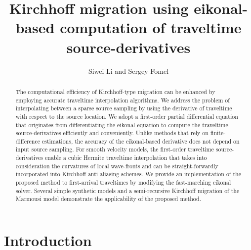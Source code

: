 \title{Kirchhoff migration using eikonal-based computation of traveltime source-derivatives}

\author{Siwei Li and Sergey Fomel}


\address{Bureau of Economic Geology \\
John A. and Katherine G. Jackson School of Geosciences \\
The University of Texas at Austin \\
University Station, Box X \\
Austin, TX 78713-8924}


\maketitle

\begin{abstract}
The computational efficiency of Kirchhoff-type migration can be enhanced by employing accurate 
traveltime interpolation algorithms. We address the problem of interpolating between a sparse source 
sampling by using the derivative of traveltime with respect to the source location. We adopt a 
first-order partial differential equation that originates from differentiating the eikonal equation 
to compute the traveltime source-derivatives efficiently and conveniently. Unlike methods that rely 
on finite-difference estimations, the accuracy of the eikonal-based derivative does not depend on 
input source sampling. For smooth velocity models, the first-order traveltime source-derivatives 
enable a cubic Hermite traveltime interpolation that takes into consideration the curvatures of 
local wave-fronts and can be straight-forwardly incorporated into Kirchhoff anti-aliasing schemes. 
We provide an implementation of the proposed method to first-arrival traveltimes by modifying the 
fast-marching eikonal solver. Several simple synthetic models and a semi-recursive Kirchhoff migration 
of the Marmousi model demonstrate the applicability of the proposed method.
\end{abstract}

\section{Introduction}

